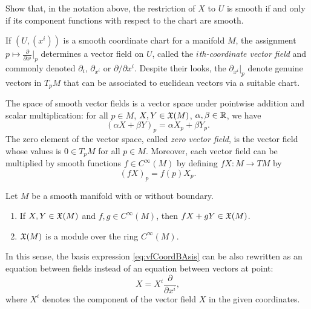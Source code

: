 \begin{exercise}
  Show that, in the notation above, the restriction of $X$ to $U$ is smooth if and only if its component functions with respect to the chart are smooth.
\end{exercise}

\begin{example}
  If $(U, (x^i))$ is a smooth coordinate chart for a manifold $M$, the assignment $p \mapsto \frac{\partial}{\partial x^i}\big|_p$ determines a vector field on $U$, called the \emph{$i$th-coordinate vector field} and commonly denoted $\partial_{i}$, $\partial_{x^i}$ or $\partial/\partial x^i$.
  Despite their looks, the $\partial_{x^i}|_p$ denote genuine vectors in $T_p M$ that can be associated to euclidean vectors via a suitable chart.
\end{example}

The space of smooth vector fields is a vector space under pointwise addition and scalar multiplication: for all $p\in M$, $X,Y\in\mathfrak{X}(M)$, $\alpha, \beta \in \mathbb{R}$, we have
\begin{equation}
  (\alpha X + \beta Y)_p = \alpha X_p + \beta Y_p.
\end{equation}
The zero element of the vector space, called \emph{zero vector field}, is the vector field whose values is $0\in T_pM$ for all $p\in M$.
Moreover, each vector field can be multiplied by smooth functions $f\in C^\infty(M)$ by defining $fX:M\to  TM$ by
\begin{equation}
  (fX)_p = f(p)X_p.
\end{equation}

\begin{proposition}
  Let $M$ be a smooth manifold with or without boundary.
  \begin{enumerate}
    \item If $X,Y \in \mathfrak{X}(M)$ and $f,g\in C^\infty(M)$, then $fX+gY \in\mathfrak{X}(M)$.
    \item $\mathfrak{X}(M)$ is a module over the ring $C^\infty(M)$.
  \end{enumerate}
\end{proposition}

In this sense, the basis expression \eqref{eq:vfCoordBAsis} can be also rewritten as an equation between fields instead of an equation between vectors at point:
\begin{equation}\label{eq:vfCoordBAsis}
  X = X^i \frac{\partial}{\partial x^i},
\end{equation}
where $X^i$ denotes the component of the vector field $X$ in the given coordinates.

